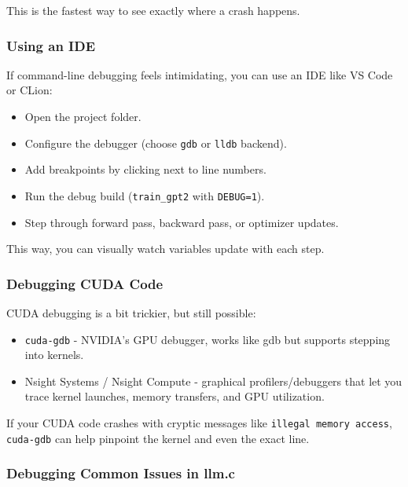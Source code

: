 \documentclass[
  letterpaper,
  DIV=11,
  numbers=noendperiod]{scrreprt}
\providecommand{\tightlist}{%
  \setlength{\itemsep}{0pt}\setlength{\parskip}{0pt}}
\begin{document}
This is the fastest way to see exactly where a crash happens.

\subsubsection{Using an IDE}\label{using-an-ide}

If command-line debugging feels intimidating, you can use an IDE like VS
Code or CLion:

\begin{itemize}
\tightlist
\item
  Open the project folder.
\item
  Configure the debugger (choose \texttt{gdb} or \texttt{lldb} backend).
\item
  Add breakpoints by clicking next to line numbers.
\item
  Run the debug build (\texttt{train\_gpt2} with \texttt{DEBUG=1}).
\item
  Step through forward pass, backward pass, or optimizer updates.
\end{itemize}

This way, you can visually watch variables update with each step.

\subsubsection{Debugging CUDA Code}\label{debugging-cuda-code}

CUDA debugging is a bit trickier, but still possible:

\begin{itemize}
\tightlist
\item
  \texttt{cuda-gdb} - NVIDIA's GPU debugger, works like gdb but supports
  stepping into kernels.
\item
  Nsight Systems / Nsight Compute - graphical profilers/debuggers that
  let you trace kernel launches, memory transfers, and GPU utilization.
\end{itemize}

If your CUDA code crashes with cryptic messages like
\texttt{illegal\ memory\ access}, \texttt{cuda-gdb} can help pinpoint
the kernel and even the exact line.

\subsubsection{Debugging Common Issues in
llm.c}\label{debugging-common-issues-in-llm.c}
\end{document}
